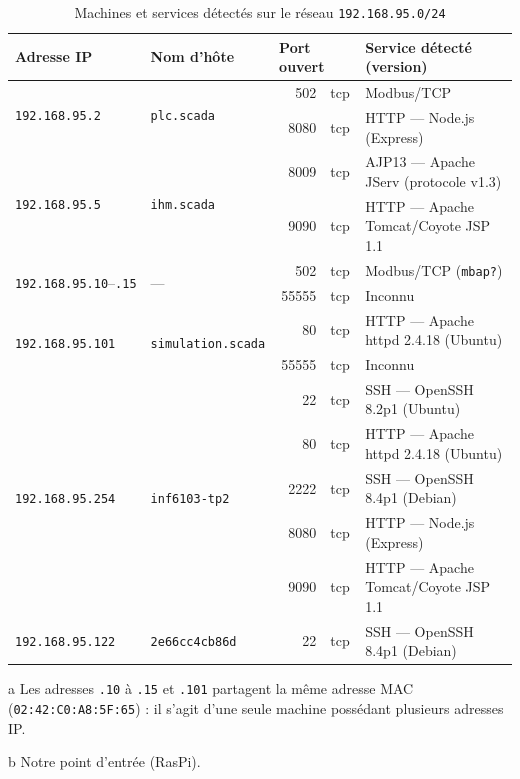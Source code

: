 \documentclass[11pt,letterpaper]{article}
\begin{document}
\begin{table}[H]
  \centering
  \small
  \begin{threeparttable}
  \caption{Machines et services détectés sur le réseau \texttt{192.168.95.0/24}}
  \label{tab:hosts}
  \renewcommand{\arraystretch}{1.15}
  \begin{tabular}{@{}l l r l l@{}}
    \toprule
    \textbf{Adresse IP} & \textbf{Nom d'hôte} & \multicolumn{2}{l}{\textbf{Port ouvert}} & \textbf{Service détecté (version)} \\
    \midrule
    \multirow{2}{*}{\texttt{192.168.95.2}}   & \multirow{2}{*}{\texttt{plc.scada}}
      & 502  & tcp & Modbus/TCP \\
    & & 8080 & tcp & HTTP --- Node.js (Express) \\
    \cmidrule(l){1-5}
    \multirow{2}{*}{\texttt{192.168.95.5}}   & \multirow{2}{*}{\texttt{ihm.scada}}
      & 8009 & tcp & AJP13 --- Apache JServ (protocole v1.3) \\
    & & 9090 & tcp & HTTP --- Apache Tomcat/Coyote JSP 1.1 \\
    \cmidrule(l){1-5}
    \multirow{2}{*}{\texttt{192.168.95.10}--\texttt{.15}\tnote{a}} & \multirow{2}{*}{---}
      & 502   & tcp & Modbus/TCP (\texttt{mbap?}) \\
    & & 55555 & tcp & Inconnu \\
    \cmidrule(l){1-5}
    \multirow{2}{*}{\texttt{192.168.95.101}\tnote{a}} & \multirow{2}{*}{\texttt{simulation.scada}}
      & 80    & tcp & HTTP --- Apache httpd 2.4.18 (Ubuntu) \\
    & & 55555 & tcp & Inconnu \\
    \cmidrule(l){1-5}
    \multirow{5}{*}{\texttt{192.168.95.254}} & \multirow{5}{*}{\texttt{inf6103-tp2}}
      & 22   & tcp & SSH --- OpenSSH 8.2p1 (Ubuntu) \\
    & & 80   & tcp & HTTP --- Apache httpd 2.4.18 (Ubuntu) \\
    & & 2222 & tcp & SSH --- OpenSSH 8.4p1 (Debian) \\
    & & 8080 & tcp & HTTP --- Node.js (Express) \\
    & & 9090 & tcp & HTTP --- Apache Tomcat/Coyote JSP 1.1 \\
    \cmidrule(l){1-5}
    \texttt{192.168.95.122} & \texttt{2e66cc4cb86d}\tnote{b}
      & 22   & tcp & SSH --- OpenSSH 8.4p1 (Debian) \\
    \bottomrule
  \end{tabular}
  \begin{tablenotes}\footnotesize
    \item[a] Les adresses \texttt{.10} à \texttt{.15} et \texttt{.101}
      partagent la même adresse MAC (\texttt{02:42:C0:A8:5F:65}) : il s'agit
      d'une seule machine possédant plusieurs adresses IP.
    \item[b] Notre point d'entrée (RasPi).
  \end{tablenotes}
  \end{threeparttable}
\end{table}
\end{document}
